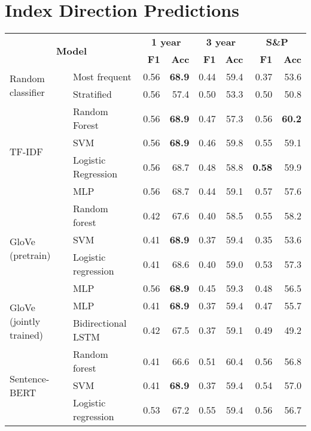 \section{Index Direction Predictions}\label{sec:res_dir}

\begin{table}[H]
    \centering
    \begin{tabular}{llrrrrrr}
    \hline
        \multicolumn{2}{c}{\multirow{2}{*}{\textbf{Model}}} & \multicolumn{2}{c}{\textbf{1 year}} & \multicolumn{2}{c}{\textbf{3 year}} & \multicolumn{2}{c}{\textbf{S\&P}} \\
      & & \textbf{F1} & \textbf{Acc} & \textbf{F1} & \textbf{Acc} & \textbf{F1} & \textbf{Acc} \\
        \hline \hline   
        \multirow{2}{*}{Random classifier} & Most frequent & 0.56 & \textbf{68.9} & 0.44 & 59.4 & 0.37 & 53.6 \\
        & Stratified & 0.56 & 57.4 & 0.50 & 53.3 & 0.50 & 50.8 \\
        \hline 
        \multirow{4}{*}{TF-IDF} & Random Forest & 0.56 & \textbf{68.9} & 0.47 & 57.3 & 0.56 & \textbf{60.2} \\
        & SVM & 0.56 & \textbf{68.9} & 0.46 & 59.8 & 0.55 & 59.1 \\
        & Logistic Regression & 0.56 & 68.7 & 0.48 & 58.8 & \textbf{0.58} & 59.9  \\
        & MLP & 0.56 & 68.7 & 0.44 & 59.1 & 0.57 & 57.6 \\
        \hline 
        \multirow{4}{*}{GloVe (pretrain)} & Random forest & 0.42 & 67.6 & 0.40 & 58.5 & 0.55 & 58.2 \\
        & SVM & 0.41 & \textbf{68.9} & 0.37 & 59.4 & 0.35 & 53.6 \\
        & Logistic regression & 0.41 & 68.6 & 0.40 & 59.0 & 0.53 & 57.3 \\
        & MLP & 0.56 & \textbf{68.9} & 0.45 & 59.3 & 0.48 & 56.5 \\
        \hline 
        \multirow{2}{*}{GloVe (jointly trained)} & MLP & 0.41 & \textbf{68.9} & 0.37 & 59.4 & 0.47 & 55.7 \\
        & Bidirectional LSTM & 0.42 & 67.5 & 0.37 & 59.1 & 0.49 & 49.2  \\
        \hline 
        \multirow{4}{*}{Sentence-BERT} & Random forest & 0.41 & 66.6 & 0.51 & 60.4 & 0.56 & 56.8 \\
        & SVM & 0.41 & \textbf{68.9} & 0.37 & 59.4 & 0.54 & 57.0 \\
        & Logistic regression & 0.53 & 67.2 & 0.55 & 59.4 & 0.56 & 56.7  \\

\end{tabular}
\end{table}
